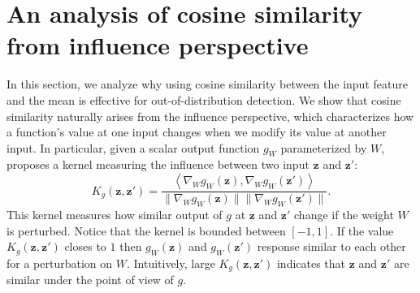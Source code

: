 \documentclass[nohyperref]{article}
\theoremstyle{plain}
\theoremstyle{definition}
\theoremstyle{remark}
\begin{document}
\begin{table}[ht]
  \caption{\textbf{Cosine similarity is effective.} Test accuracy and OOD Detection performance (AUROC) of models before and after modification.}
  \label{tab:acc_angular_pred}
  \centering
\end{table}


\section{An analysis of cosine similarity from influence perspective}
\label{sec:analysis}
In this section, we analyze why using cosine similarity between the input feature and the mean is effective for out-of-distribution detection. 
We show that cosine similarity naturally arises from the influence perspective, which characterizes how a function's value at one input changes when we modify its value at another input.
In particular, given a scalar output function $g_W$ parameterized by $W$, \citet{charpiat2019input} proposes a kernel measuring the influence between two input $\mathbf{z}$ and $\mathbf{z}'$: 
\begin{equation*}
    K_{g}(\mathbf{z}, \mathbf{z}') = \frac{\left< \nabla_W g_W(\mathbf{z}),  \nabla_W g_W(\mathbf{z}') \right>}{\| \nabla_W g_W(\mathbf{z})\| \|  \nabla_W g_W(\mathbf{z}')\|}.
\end{equation*}
This kernel measures how similar output of $g$ at $\mathbf{z}$ and $\mathbf{z}'$ change if the weight $W$ is perturbed.
Notice that the kernel is bounded between $[-1, 1]$.
If the value $K_g(\mathbf{z}, \mathbf{z}')$ closes to $1$ then $g_W(\mathbf{z})$ and $g_W(\mathbf{z}')$ response similar to each other for a perturbation on $W$.
Intuitively, large $K_g(\mathbf{z}, \mathbf{z}')$ indicates that $\mathbf{z}$ and $\mathbf{z}'$ are similar under the point of view of $g$.
\end{document}
